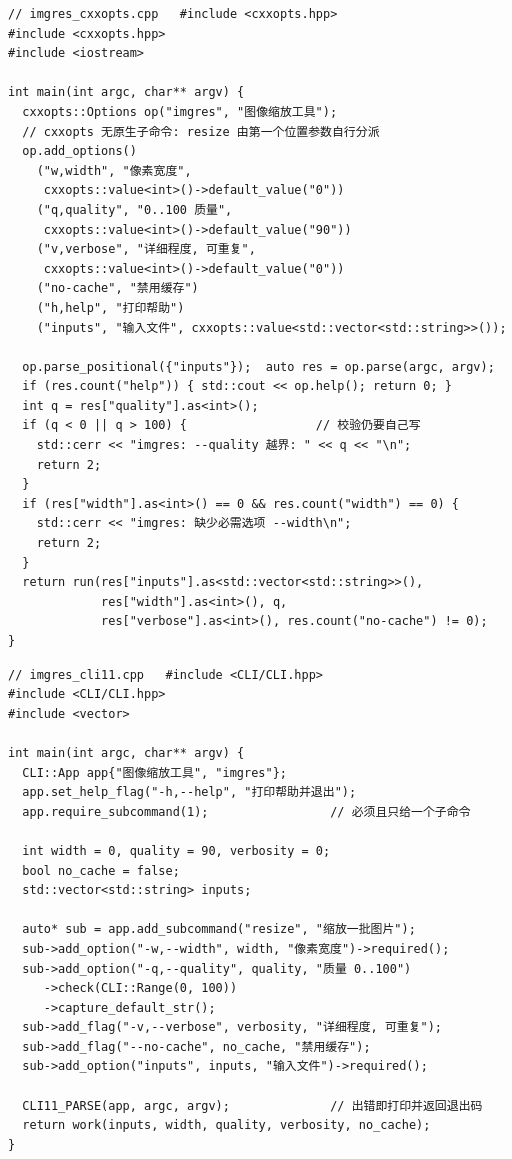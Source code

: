 \documentclass[12pt,a4paper,fontset=fandol]{ctexbook}
\begin{document}
\begin{lstlisting}[caption={写法二：cxxopts（短小，风格接近 getopt）}]
// imgres_cxxopts.cpp   #include <cxxopts.hpp>
#include <cxxopts.hpp>
#include <iostream>

int main(int argc, char** argv) {
  cxxopts::Options op("imgres", "图像缩放工具");
  // cxxopts 无原生子命令: resize 由第一个位置参数自行分派
  op.add_options()
    ("w,width", "像素宽度",
     cxxopts::value<int>()->default_value("0"))
    ("q,quality", "0..100 质量",
     cxxopts::value<int>()->default_value("90"))
    ("v,verbose", "详细程度, 可重复",
     cxxopts::value<int>()->default_value("0"))
    ("no-cache", "禁用缓存")
    ("h,help", "打印帮助")
    ("inputs", "输入文件", cxxopts::value<std::vector<std::string>>());

  op.parse_positional({"inputs"});  auto res = op.parse(argc, argv);
  if (res.count("help")) { std::cout << op.help(); return 0; }
  int q = res["quality"].as<int>();
  if (q < 0 || q > 100) {                  // 校验仍要自己写
    std::cerr << "imgres: --quality 越界: " << q << "\n";
    return 2;
  }
  if (res["width"].as<int>() == 0 && res.count("width") == 0) {
    std::cerr << "imgres: 缺少必需选项 --width\n";
    return 2;
  }
  return run(res["inputs"].as<std::vector<std::string>>(),
             res["width"].as<int>(), q,
             res["verbose"].as<int>(), res.count("no-cache") != 0);
}
\end{lstlisting}

\begin{lstlisting}[caption={写法三：CLI11（表达力与错误信息最好）}]
// imgres_cli11.cpp   #include <CLI/CLI.hpp>
#include <CLI/CLI.hpp>
#include <vector>

int main(int argc, char** argv) {
  CLI::App app{"图像缩放工具", "imgres"};
  app.set_help_flag("-h,--help", "打印帮助并退出");
  app.require_subcommand(1);                 // 必须且只给一个子命令

  int width = 0, quality = 90, verbosity = 0;
  bool no_cache = false;
  std::vector<std::string> inputs;

  auto* sub = app.add_subcommand("resize", "缩放一批图片");
  sub->add_option("-w,--width", width, "像素宽度")->required();
  sub->add_option("-q,--quality", quality, "质量 0..100")
     ->check(CLI::Range(0, 100))
     ->capture_default_str();
  sub->add_flag("-v,--verbose", verbosity, "详细程度, 可重复");
  sub->add_flag("--no-cache", no_cache, "禁用缓存");
  sub->add_option("inputs", inputs, "输入文件")->required();

  CLI11_PARSE(app, argc, argv);              // 出错即打印并返回退出码
  return work(inputs, width, quality, verbosity, no_cache);
}
\end{lstlisting}
\end{document}
